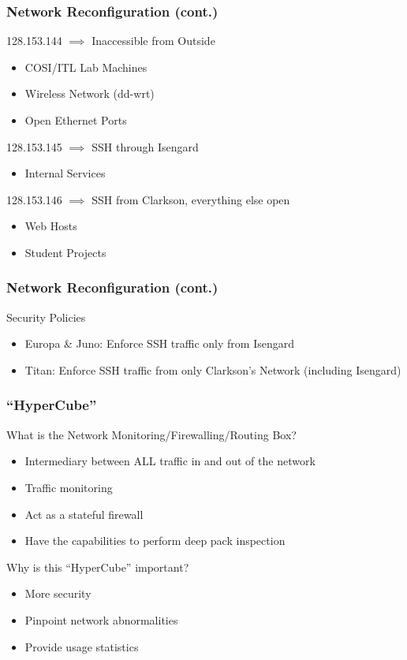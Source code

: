 \documentclass{beamer}
\begin{document}
\begin{frame}
  \frametitle{Network Reconfiguration (cont.)}
128.153.144 $\implies$ Inaccessible from Outside
  \begin{itemize}
    \item COSI/ITL Lab Machines
    \item Wireless Network (dd-wrt)
    \item Open Ethernet Ports
  \end{itemize}
128.153.145 $\implies$ SSH through Isengard
  \begin{itemize}
    \item Internal Services
  \end{itemize}
128.153.146 $\implies$ SSH from Clarkson, everything else open
  \begin{itemize}
    \item Web Hosts
    \item Student Projects
  \end{itemize}
\end{frame}
\begin{frame}
  \frametitle{Network Reconfiguration (cont.)}
Security Policies
  \begin{itemize}
      \item Europa \& Juno: Enforce SSH traffic only from Isengard
      \item Titan: Enforce SSH traffic from only Clarkson's Network (including Isengard)

  \end{itemize}
\end{frame}

\begin{frame}
  \frametitle{``HyperCube''}
What is the Network Monitoring/Firewalling/Routing Box?
  \begin{itemize}
    \item Intermediary between ALL traffic in and out of the network
    \item Traffic monitoring
    \item Act as a stateful firewall
    \item Have the capabilities to perform deep pack inspection
  \end{itemize}
Why is this ``HyperCube'' important?
  \begin{itemize}
    \item More security
    \item Pinpoint network abnormalities
    \item Provide usage statistics
  \end{itemize}
\end{frame}
\end{document}
